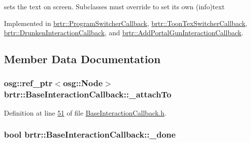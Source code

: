 sets the text on screen. Subclasses must override to set its own (info)text 



Implemented in \hyperlink{classbrtr_1_1_program_switcher_callback_a2202619d98a432578c8ed7342b957638}{brtr\+::\+Program\+Switcher\+Callback}, \hyperlink{classbrtr_1_1_toon_tex_switcher_callback_aad13301231829b5c28f14910d4d44355}{brtr\+::\+Toon\+Tex\+Switcher\+Callback}, \hyperlink{classbrtr_1_1_drunken_interaction_callback_a71b86fc410bf2965ca998eff1350cfaf}{brtr\+::\+Drunken\+Interaction\+Callback}, and \hyperlink{classbrtr_1_1_add_portal_gun_interaction_callback_aa0db50622c7ae1cd25f8554c916137db}{brtr\+::\+Add\+Portal\+Gun\+Interaction\+Callback}.



\subsection{Member Data Documentation}
\hypertarget{classbrtr_1_1_base_interaction_callback_a6666bae9f8f89ebbf75637c922ebfb54}{
\subsubsection[{\+\_\+attach\+To}]{\setlength{\rightskip}{0pt plus 5cm}osg\+::ref\+\_\+ptr$<$osg\+::\+Node$>$ brtr\+::\+Base\+Interaction\+Callback\+::\+\_\+attach\+To\hspace{0.3cm}{\ttfamily [protected]}}}\label{classbrtr_1_1_base_interaction_callback_a6666bae9f8f89ebbf75637c922ebfb54}


Definition at line \hyperlink{_base_interaction_callback_8h_source_l00051}{51} of file \hyperlink{_base_interaction_callback_8h_source}{Base\+Interaction\+Callback.\+h}.

\hypertarget{classbrtr_1_1_base_interaction_callback_a2f36052886ec60a227e0734bfbc4bdbb}{
\subsubsection[{\+\_\+done}]{\setlength{\rightskip}{0pt plus 5cm}bool brtr\+::\+Base\+Interaction\+Callback\+::\+\_\+done\hspace{0.3cm}{\ttfamily [protected]}}}\label{classbrtr_1_1_base_interaction_callback_a2f36052886ec60a227e0734bfbc4bdbb}


